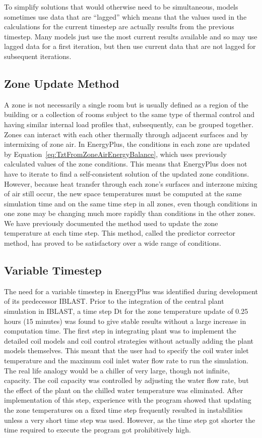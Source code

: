 To simplify solutions that would otherwise need to be simultaneous, models sometimes use data that are ``lagged'' which means that the values used in the calculations for the current timestep are actually results from the previous timestep. Many models just use the most current results available and so may use lagged data for a first iteration, but then use current data that are not lagged for subsequent iterations.

\subsection{Zone Update Method}\label{zone-update-method}

A zone is not necessarily a single room but is usually defined as a region of the building or a collection of rooms subject to the same type of thermal control and having similar internal load profiles that, subsequently, can be grouped together. Zones can interact with each other thermally through adjacent surfaces and by intermixing of zone air. In EnergyPlus, the conditions in each zone are updated by Equation~\ref{eq:TztFromZoneAirEnergyBalance}, which uses previously calculated values of the zone conditions. This means that EnergyPlus does not have to iterate to find a self-consistent solution of the updated zone conditions. However, because heat transfer through each zone's surfaces and interzone mixing of air still occur, the new space temperatures must be computed at the same simulation time and on the same time step in all zones, even though conditions in one zone may be changing much more rapidly than conditions in the other zones. We have previously documented the method used to update the zone temperature at each time step. This method, called the predictor corrector method, has proved to be satisfactory over a wide range of conditions.

\subsection{Variable Timestep}\label{variable-timestep}

The need for a variable timestep in EnergyPlus was identified during development of its predecessor IBLAST. Prior to the integration of the central plant simulation in IBLAST, a time step Dt for the zone temperature update of 0.25 hours (15 minutes) was found to give stable results without a large increase in computation time. The first step in integrating plant was to implement the detailed coil models and coil control strategies without actually adding the plant models themselves. This meant that the user had to specify the coil water inlet temperature and the maximum coil inlet water flow rate to run the simulation. The real life analogy would be a chiller of very large, though not infinite, capacity. The coil capacity was controlled by adjusting the water flow rate, but the effect of the plant on the chilled water temperature was eliminated. After implementation of this step, experience with the program showed that updating the zone temperatures on a fixed time step frequently resulted in instabilities unless a very short time step was used. However, as the time step got shorter the time required to execute the program got prohibitively high.


